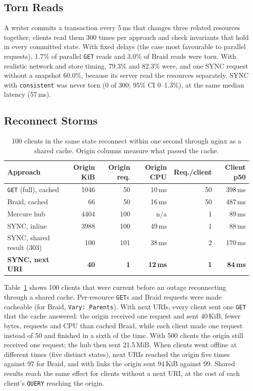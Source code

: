 \documentclass[11pt,a4paper]{article}
\begin{document}
\subsection{Torn Reads}

A writer commits a transaction every 5\,ms that changes three related resources together; clients read them 300 times per approach and check invariants that hold in every committed state. With fixed delays (the case most favourable to parallel requests), 1.7\% of parallel \texttt{GET} reads and 3.0\% of Braid reads were torn. With realistic network and store timing, 79.3\% and 82.3\% were, and one SYNC request without a snapshot 60.0\%, because its server read the resources separately. SYNC with \texttt{consistent} was never torn (0 of 300; 95\% CI 0--1.3\%), at the same median latency (57\,ms).

\subsection{Reconnect Storms}

\begin{table}[h]
\centering
\footnotesize
\setlength{\tabcolsep}{4pt}
\begin{tabular}{lrrrrr}
\toprule
\textbf{Approach} & \textbf{Origin KiB} & \textbf{Origin req.} & \textbf{Origin CPU} & \textbf{Req./client} & \textbf{Client p50} \\
\midrule
\texttt{GET} (full), cached & 1046 & 50 & 10\,ms & 50 & 398\,ms \\
Braid, cached & 66 & 50 & 16\,ms & 50 & 487\,ms \\
Mercure hub & 4404 & 100 & n/a & 1 & 89\,ms \\
SYNC, inline & 3988 & 100 & 49\,ms & 1 & 88\,ms \\
SYNC, shared result (303) & 100 & 101 & 38\,ms & 2 & 170\,ms \\
\textbf{SYNC, next URI} & \textbf{40} & \textbf{1} & \textbf{12\,ms} & \textbf{1} & \textbf{84\,ms} \\
\bottomrule
\end{tabular}
\caption{100 clients in the same state reconnect within one second through nginx as a shared cache. Origin columns measure what passed the cache.}
\label{tab:storm}
\end{table}

Table~\ref{tab:storm} shows 100 clients that were current before an outage reconnecting through a shared cache. Per-resource \texttt{GET}s and Braid requests were made cacheable (for Braid, \texttt{Vary: Parents}). With next URIs, every client sent one \texttt{GET} that the cache answered: the origin received one request and sent 40\,KiB, fewer bytes, requests and CPU than cached Braid, while each client made one request instead of 50 and finished in a sixth of the time. With 500 clients the origin still received one request; the hub then sent 21.5\,MiB. When clients went offline at different times (five distinct states), next URIs reached the origin five times against 97 for Braid, and with links the origin sent 94\,KiB against 99. Shared results reach the same effect for clients without a next URI, at the cost of each client's \texttt{QUERY} reaching the origin.
\end{document}
